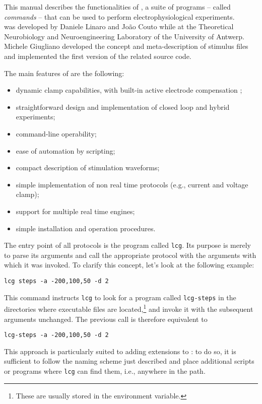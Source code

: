 This manual describes the functionalities of \progname, a suite of
programs -- called {\it commands} -- that can be used to
perform electrophysiological experiments.\\
\progname was developed by Daniele Linaro and Jo\~ao Couto while at
the Theoretical Neurobiology and Neuroengineering Laboratory of the
University of Antwerp. Michele Giugliano developed the concept and
meta-description of stimulus files and implemented the first version
of the related source code.

The main features of \progname are the following:
\begin{itemize}
\item dynamic clamp capabilities, with built-in active electrode
compensation \cite{Brette:2008};
\item straightforward design and implementation of closed loop and
hybrid experiments;
\item command-line operability;
\item ease of automation by scripting;
\item compact description of stimulation waveforms;
\item simple implementation of non real time protocols (e.g., current
  and voltage clamp);
\item support for multiple real time engines;
\item simple installation and operation procedures.
\end{itemize}

The entry point of all \progname protocols is the program called
\verb+lcg+. Its purpose is merely to parse its arguments and
call the appropriate protocol with the arguments with which it was
invoked. To clarify this concept, let's look at the following example:
\begin{lstlisting}
lcg steps -a -200,100,50 -d 2
\end{lstlisting}
This command instructs \verb+lcg+ to look for a program called
\verb+lcg-steps+ in the directories where executable files are
located,\footnote{These are usually stored in the 
environment variable.} and invoke it with the subsequent arguments
unchanged. The previous call is therefore equivalent to
\begin{lstlisting}
lcg-steps -a -200,100,50 -d 2
\end{lstlisting}
This approach is particularly suited to adding extensions to
\progname: to do so, it is sufficient to follow the naming scheme just
described and place additional scripts or programs where
\verb+lcg+ can find them, i.e., anywhere in the path.
 

